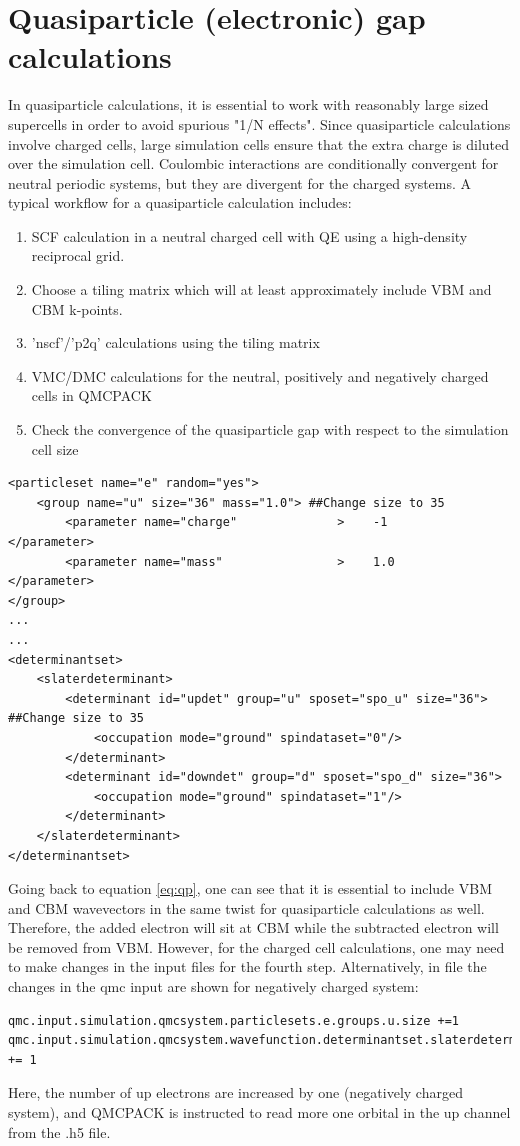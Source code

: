 \section{Quasiparticle (electronic) gap calculations}\label{sec:lab_ex_qp}
In quasiparticle calculations, it is essential to work with reasonably large sized supercells in order to avoid spurious "1/N effects". 
Since quasiparticle calculations involve charged cells, large simulation cells ensure that the extra charge is diluted over the simulation cell. Coulombic interactions are conditionally convergent for neutral periodic systems, but they are divergent for the charged systems. 
A typical workflow for a quasiparticle calculation includes:
\begin{enumerate}
	\item SCF calculation in a neutral charged cell with QE using a high-density reciprocal grid.
	\item Choose a tiling matrix which will at least approximately include VBM and CBM k-points. 
	\item 'nscf'/'p2q' calculations using the tiling matrix 
	\item VMC/DMC calculations for the neutral, positively and negatively charged cells in QMCPACK
	\item Check the convergence of the quasiparticle gap with respect to the simulation cell size
\end{enumerate}
\begin{lstlisting}[style=QMCPXML]
<particleset name="e" random="yes">
	<group name="u" size="36" mass="1.0"> ##Change size to 35
		<parameter name="charge"              >    -1                    </parameter>
		<parameter name="mass"                >    1.0                   </parameter>
</group>
...
...
<determinantset>
	<slaterdeterminant>
		<determinant id="updet" group="u" sposet="spo_u" size="36"> ##Change size to 35
		    <occupation mode="ground" spindataset="0"/>	
		</determinant>
		<determinant id="downdet" group="d" sposet="spo_d" size="36">
		    <occupation mode="ground" spindataset="1"/>	
		</determinant>
	</slaterdeterminant>
</determinantset>
\end{lstlisting}
Going back to equation \ref{eq:qp}, one can see that it is essential to include VBM and CBM wavevectors in the same twist for quasiparticle calculations as well. 
Therefore, the added electron will sit at CBM while the subtracted electron will be removed from VBM. 
However, for the charged cell calculations, one may need to make changes in the input files for the fourth step.  Alternatively, in  file the changes in the qmc input are shown for negatively charged system:
\begin{lstlisting}[style=Python]
qmc.input.simulation.qmcsystem.particlesets.e.groups.u.size +=1
qmc.input.simulation.qmcsystem.wavefunction.determinantset.slaterdeterminant.determinants.updet.size += 1
\end{lstlisting}
Here, the number of up electrons are increased by one (negatively charged system), and QMCPACK is instructed to read more one orbital in the up channel from the .h5 file. 

